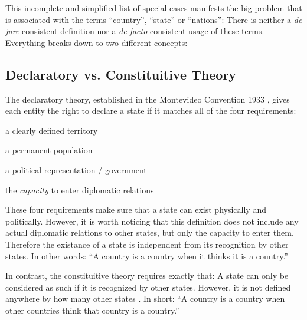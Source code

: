 

This incomplete and simplified list of special cases manifests the big problem that is associated with the terms ``country'', ``state'' or ``nations'': There is neither a \emph{de jure} consistent definition nor a \emph{de facto} consistent usage of these terms. Everything breaks down to two different concepts:



\subsection{Declaratory vs. Constituitive Theory} %
\label{sub:declaratory_vs_constituitive_theory}

The declaratory theory, established in the Montevideo Convention 1933 \cite{MontevideoConvention}, gives each entity the right to declare a state if it matches all of the four requirements:
\begin{compactenum}
  \item a clearly defined territory
  \item a permanent population
  \item a political representation / government
  \item the \emph{capacity} to enter diplomatic relations
\end{compactenum}

These four requirements make sure that a state can exist physically and politically. However, it is worth noticing that this definition does not include any actual diplomatic relations to other states, but only the capacity to enter them. Therefore the existance of a state is independent from its recognition by other states. In other words: ``A country is a country when it thinks it is a country.''

In contrast, the constituitive theory requires exactly that: A state can only be considered as such if it is recognized by other states. However, it is not defined anywhere by how many other states \cite{StateTheory}. In short: ``A country is a country when other countries think that country is a country.'' \cite{greyCountries}


